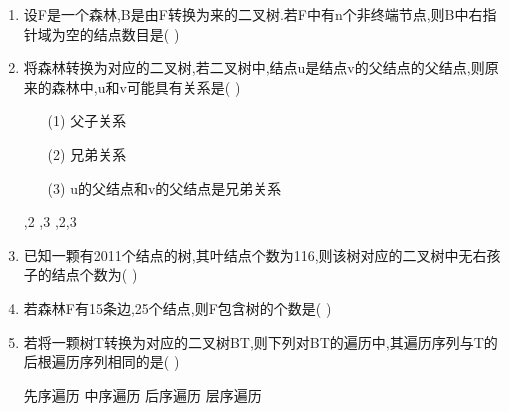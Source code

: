 \documentclass[12pt, a4paper, oneside, UTF8]{ctexbook}
\begin{document}
\begin{enumerate}
    \item 设F是一个森林,B是由F转换为来的二叉树.若F中有n个非终端节点,则B中右指针域为空的结点数目是(    ) 

    \item \bl 将森林转换为对应的二叉树,若二叉树中,结点u是结点v的父结点的父结点,则原来的森林中,u和v可能具有关系是(   ) 
    \begin{enumerate}
        \item [(1)] 父子关系 
        \item [(2)] 兄弟关系
        \item [(3)] u的父结点和v的父结点是兄弟关系
    \end{enumerate}
    \begin{choices}
        ,2
        ,3
        ,2,3 
    \end{choices}

    \item \bl 已知一颗有2011个结点的树,其叶结点个数为116,则该树对应的二叉树中无右孩子的结点个数为(   )
    \begin{choices}
    \end{choices}

    \item \bl 若森林F有15条边,25个结点,则F包含树的个数是(    ) 

    \item \bl 若将一颗树T转换为对应的二叉树BT,则下列对BT的遍历中,其遍历序列与T的后根遍历序列相同的是(   ) 
    \begin{choices}
        \task 先序遍历
        \task 中序遍历
        \task 后序遍历
        \task 层序遍历
    \end{choices}


\end{enumerate}
\end{document}
